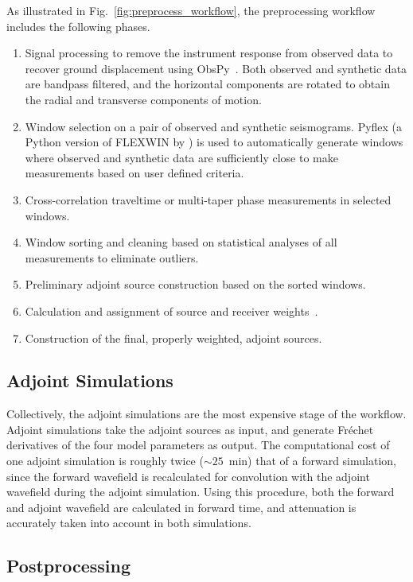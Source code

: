 \documentclass[extra,mreferee]{gji}
\begin{document}
As illustrated in Fig.~\ref{fig:preprocess_workflow}, the preprocessing workflow
includes the following phases.
\begin{enumerate}
  \item Signal processing to remove the instrument response from observed data
    to recover ground displacement using ObsPy~\citep{obspy2010}. Both observed and synthetic data are bandpass
    filtered, and the horizontal components are rotated to obtain the radial and transverse components of motion.
  \item Window selection on a pair of
    observed and synthetic seismograms. Pyflex (a Python version
    of FLEXWIN by \citet{krischer2015}) is
    used to automatically generate windows where observed and
    synthetic data are sufficiently close to make measurements based on user defined
    criteria.
  \item Cross-correlation traveltime or multi-taper phase measurements in selected windows.
  \item Window sorting and cleaning based on statistical analyses of all measurements to eliminate outliers.
  \item Preliminary adjoint source construction based on the sorted windows.
  \item Calculation and assignment of source and receiver weights~\citep{Ruanetal2018}.
  \item Construction of the final, properly weighted, adjoint sources.
\end{enumerate}

\subsection{Adjoint Simulations}

Collectively,
the adjoint simulations are the most expensive stage of the workflow. 
Adjoint simulations take the adjoint sources as input, and generate Fr\'echet
derivatives of the four model parameters as output.
The computational cost of one adjoint simulation is roughly twice ($\sim25$~min) that of
a forward simulation, since the forward wavefield is recalculated for convolution with
the adjoint wavefield during the adjoint simulation.
Using this procedure,
both the forward and adjoint wavefield are calculated in forward time,
and attenuation is accurately taken into account in both simulations.

\subsection{Postprocessing}
\end{document}
